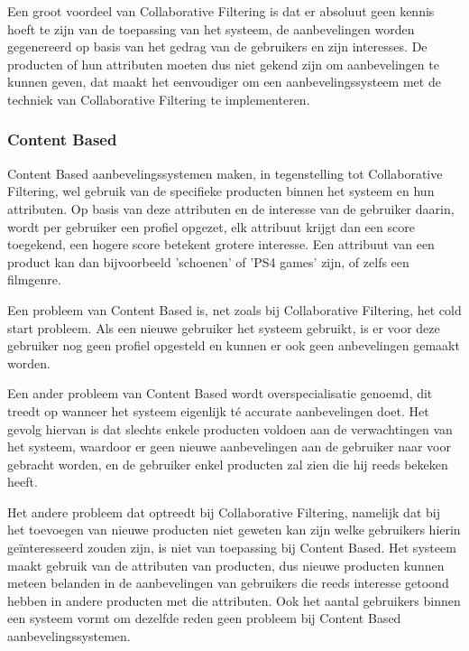 Een groot voordeel van Collaborative Filtering is dat er absoluut geen kennis hoeft te zijn van de toepassing van het systeem, de aanbevelingen worden gegenereerd op basis van het gedrag van de gebruikers en zijn interesses. De producten of hun attributen moeten dus niet gekend zijn om aanbevelingen te kunnen geven, dat maakt het eenvoudiger om een aanbevelingssysteem met de techniek van Collaborative Filtering te implementeren.

\subsubsection{Content Based}
\label{sec:Content Based}

Content Based aanbevelingssystemen \autocite{Lops2011} maken, in tegenstelling tot Collaborative Filtering, wel gebruik van de specifieke producten binnen het systeem en hun attributen. Op basis van deze attributen en de interesse van de gebruiker daarin, wordt per gebruiker een profiel opgezet, elk attribuut krijgt dan een score toegekend, een hogere score betekent grotere interesse. Een attribuut van een product kan dan bijvoorbeeld 'schoenen' of 'PS4 games' zijn, of zelfs een filmgenre.

Een probleem van Content Based is, net zoals bij Collaborative Filtering, het cold start probleem. Als een nieuwe gebruiker het systeem gebruikt, is er voor deze gebruiker nog geen profiel opgesteld en kunnen er ook geen anbevelingen gemaakt worden.

Een ander probleem van Content Based wordt overspecialisatie genoemd, dit treedt op wanneer het systeem eigenlijk té accurate aanbevelingen doet. Het gevolg hiervan is dat slechts enkele producten voldoen aan de verwachtingen van het systeem, waardoor er geen nieuwe aanbevelingen aan de gebruiker naar voor gebracht worden, en de gebruiker enkel producten zal zien die hij reeds bekeken heeft. 

Het andere probleem dat optreedt bij Collaborative Filtering, namelijk dat bij het toevoegen van nieuwe producten niet geweten kan zijn welke gebruikers hierin geïnteresseerd zouden zijn, is niet van toepassing bij Content Based. Het systeem maakt gebruik van de attributen van producten, dus nieuwe producten kunnen meteen belanden in de aanbevelingen van gebruikers die reeds interesse getoond hebben in andere producten met die attributen. Ook het aantal gebruikers binnen een systeem vormt om dezelfde reden geen probleem bij Content Based aanbevelingssystemen. 

